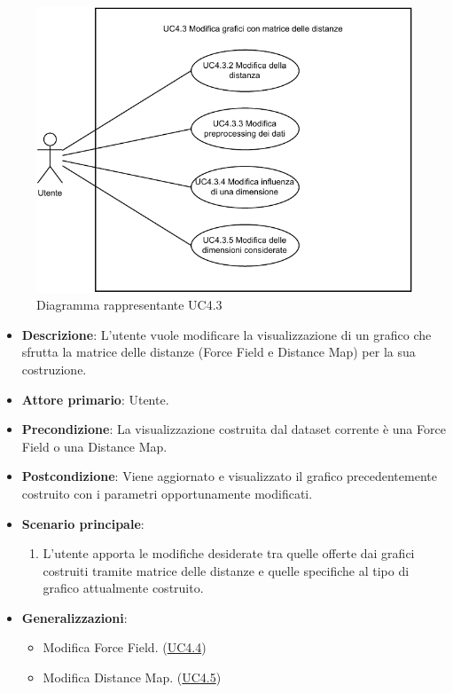 \begin{figure}[h]
    \centering
    \includegraphics[width=0.8  \textwidth]{componenti/casi-duso/diagrammi/UC4_3.pdf}
    \caption{Diagramma rappresentante UC4.3}
    \label{fig:UC4.3}
\end{figure}

\begin{itemize}
    \item \textbf{Descrizione}: L’utente vuole modificare la visualizzazione di un grafico che sfrutta la matrice delle distanze (Force Field e Distance Map)
                                per la sua costruzione.
    \item \textbf{Attore primario}: Utente.
    \item \textbf{Precondizione}: La visualizzazione costruita dal dataset corrente è una Force Field o una Distance Map.
    \item \textbf{Postcondizione}: Viene aggiornato e visualizzato il grafico precedentemente costruito con i parametri opportunamente modificati.
    \item \textbf{Scenario principale}:
    \begin{enumerate}
        \item   L’utente apporta le modifiche desiderate tra quelle offerte dai grafici costruiti tramite matrice
                delle distanze e quelle specifiche al tipo di grafico attualmente costruito.
    \end{enumerate}
    \item \textbf{Generalizzazioni}:
    \begin{itemize}
        \item Modifica Force Field. (\hyperref[ssub:uc4.4]{UC4.4})
        \item Modifica Distance Map. (\hyperref[ssub:uc4.5]{UC4.5})
    \end{itemize}
\end{itemize}

